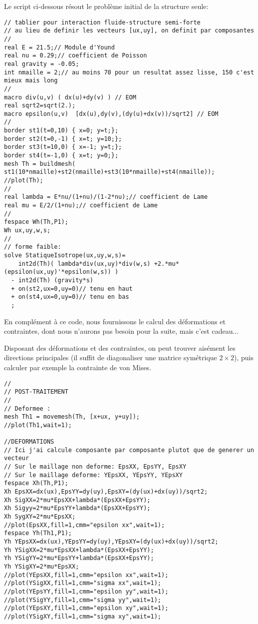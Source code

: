 Le script \freefem ci-dessous résout le problème initial de la structure seule:
\begin{lstlisting}[firstnumber=1]
// tablier pour interaction fluide-structure semi-forte
// au lieu de definir les vecteurs [ux,uy], on definit par composantes
//
real E = 21.5;// Module d'Yound
real nu = 0.29;// coefficient de Poisson
real gravity = -0.05;
int nmaille = 2;// au moins 70 pour un resultat assez lisse, 150 c'est mieux mais long
//
macro div(u,v) ( dx(u)+dy(v) ) // EOM
real sqrt2=sqrt(2.);
macro epsilon(u,v)  [dx(u),dy(v),(dy(u)+dx(v))/sqrt2] // EOM
//
border st1(t=0,10) { x=0; y=t;};
border st2(t=0,-1) { x=t; y=10;};
border st3(t=10,0) { x=-1; y=t;};
border st4(t=-1,0) { x=t; y=0;};
mesh Th = buildmesh( st1(10*nmaille)+st2(nmaille)+st3(10*nmaille)+st4(nmaille));
//plot(Th);
//
real lambda = E*nu/(1+nu)/(1-2*nu);// coefficient de Lame
real mu = E/2/(1+nu);// coefficient de Lame
//
fespace Wh(Th,P1);
Wh ux,uy,w,s;
//
// forme faible:
solve StatiqueIsotrope(ux,uy,w,s)=
	int2d(Th)( lambda*div(ux,uy)*div(w,s) +2.*mu*(epsilon(ux,uy)'*epsilon(w,s)) )
  - int2d(Th) (gravity*s)
  + on(st2,ux=0,uy=0)// tenu en haut
  + on(st4,ux=0,uy=0)// tenu en bas
  ;
\end{lstlisting}

\begin{remarque}
En complément à ce code, nous fournissons le calcul des déformations et contraintes, dont nous n'aurons pas besoin pour la suite, mais c'est cadeau...

Disposant des déformations et des contraintes, on peut trouver aisément les directions principales (il suffit de diagonaliser une matrice symétrique $2\times2$), puis calculer par exemple la contrainte de von Mises.
\begin{lstlisting}[firstnumber=last]
//
// POST-TRAITEMENT
//
// Deformee :
mesh Th1 = movemesh(Th, [x+ux, y+uy]);
//plot(Th1,wait=1);

//DEFORMATIONS
// Ici j'ai calcule composante par composante plutot que de generer un vecteur
// Sur le maillage non deforme: EpsXX, EpsYY, EpsXY
// Sur le maillage deforme: YEpsXX, YEpsYY, YEpsXY
fespace Xh(Th,P1);
Xh EpsXX=dx(ux),EpsYY=dy(uy),EpsXY=(dy(ux)+dx(uy))/sqrt2;
Xh SigXX=2*mu*EpsXX+lambda*(EpsXX+EpsYY);
Xh Sigyy=2*mu*EpsYY+lambda*(EpsXX+EpsYY);
Xh SygXY=2*mu*EpsXX;
//plot(EpsXX,fill=1,cmm="epsilon xx",wait=1);
fespace Yh(Th1,P1);
Yh YEpsXX=dx(ux),YEpsYY=dy(uy),YEpsXY=(dy(ux)+dx(uy))/sqrt2;
Yh YSigXX=2*mu*EpsXX+lambda*(EpsXX+EpsYY);
Yh YSigYY=2*mu*EpsYY+lambda*(EpsXX+EpsYY);
Yh YSigXY=2*mu*EpsXX;
//plot(YEpsXX,fill=1,cmm="epsilon xx",wait=1);
//plot(YSigXX,fill=1,cmm="sigma xx",wait=1);
//plot(YEpsYY,fill=1,cmm="epsilon yy",wait=1);
//plot(YSigYY,fill=1,cmm="sigma yy",wait=1);
//plot(YEpsXY,fill=1,cmm="epsilon xy",wait=1);
//plot(YSigXY,fill=1,cmm="sigma xy",wait=1);
\end{lstlisting}
\end{remarque}

